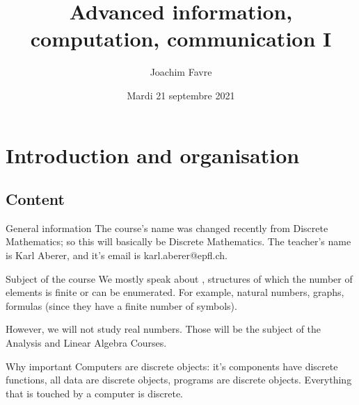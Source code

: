 \documentclass{article}
\title{Advanced information, computation, communication I}
\author{Joachim Favre}
\date{Mardi 21 septembre 2021}
\begin{document}
\maketitle


\section{Introduction and organisation}
\subsection{Content}
\begin{parag}{General information}
    The course's name was changed recently from Discrete Mathematics; so this will basically be Discrete Mathematics. The teacher's name is Karl Aberer, and it's email is karl.aberer@epfl.ch.
\end{parag}

\begin{parag}{Subject of the course}
    We mostly speak about , structures of which the number of elements is finite or can be enumerated. For example, natural numbers, graphs, formulas (since they have a finite number of symbols).

    However, we will not study real numbers. Those will be the subject of the Analysis and Linear Algebra Courses.
\end{parag}

\begin{parag}{Why important}
    Computers are discrete objects: it's components have discrete functions, all data are discrete objects, programs are discrete objects. Everything that is touched by a computer is discrete.
\end{parag}
\end{document}

